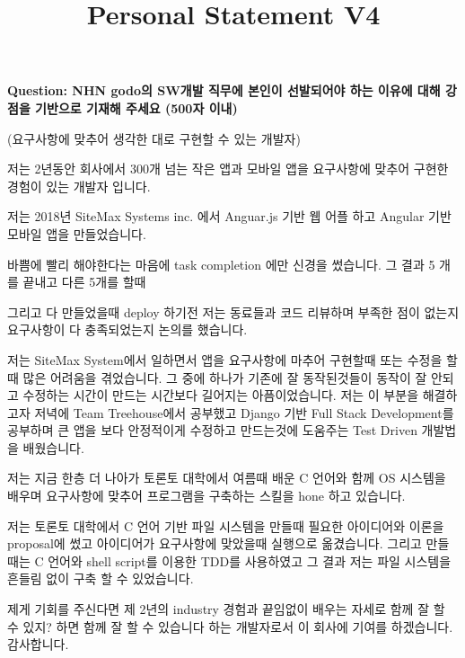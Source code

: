 \documentclass[12pt]{article}
\begin{document}
\title{Personal Statement V4}
\maketitle

\textbf{Question: NHN godo의 SW개발 직무에 본인이 선발되어야 하는 이유에 대해 강점을 기반으로 기재해 주세요 (500자 이내)}

\bigskip

(요구사항에 맞추어 생각한 대로 구현할 수 있는 개발자)

\bigskip

저는 2년동안 회사에서 300개 넘는 작은 앱과 모바일 앱을 요구사항에 맞추어 구현한 경험이 있는 개발자 입니다.

\bigskip

저는 2018년 SiteMax Systems inc. 에서 Anguar.js 기반 웹 어플 하고 Angular 기반 모바일 앱을 만들었습니다.

\bigskip

바쁨에 빨리 해야한다는 마음에 task completion 에만 신경을 썼습니다. 그 결과 5 개를 끝내고 다른 5개를 할때

\bigskip

그리고 다 만들었을때 deploy 하기전 저는 동료들과 코드 리뷰하며 부족한 점이 없는지 요구사항이 다 충족되었는지 논의를 했습니다.

\bigskip

저는 SiteMax System에서 일하면서 앱을 요구사항에 마추어 구현할때 또는 수정을 할때 많은 어려움을 겪었습니다.
그 중에 하나가 기존에 잘 동작된것들이 동작이 잘 안되고 수정하는 시간이 만드는 시간보다 길어지는 아픔이었습니다.
저는 이 부분을 해결하고자 저녁에 Team Treehouse에서 공부했고 Django 기반 Full Stack Development를
공부하며 큰 앱을 보다 안정적이게 수정하고 만드는것에 도움주는 Test Driven 개발법을 배웠습니다.

\bigskip

저는 지금 한층 더 나아가 토론토 대학에서 여름때 배운 C 언어와 함께 OS 시스템을 배우며 요구사항에 맞추어 프로그램을 구축하는 스킬을 hone 하고 있습니다.

\bigskip

저는 토론토 대학에서 C 언어 기반 파일 시스템을 만들때 필요한 아이디어와 이론을 proposal에 썼고 아이디어가 요구사항에 맞았을때 실행으로 옮겼습니다.
그리고 만들때는 C 언어와 shell script를 이용한 TDD를 사용하였고 그 결과 저는 파일 시스템을 흔들림 없이 구축 할 수 있었습니다.

\bigskip

제게 기회를 주신다면 제 2년의 industry 경험과 끝임없이 배우는 자세로 함께 잘 할 수 있지? 하면 함께 잘 할 수 있습니다
하는 개발자로서 이 회사에 기여를 하겠습니다. 감사합니다.
\end{document}
